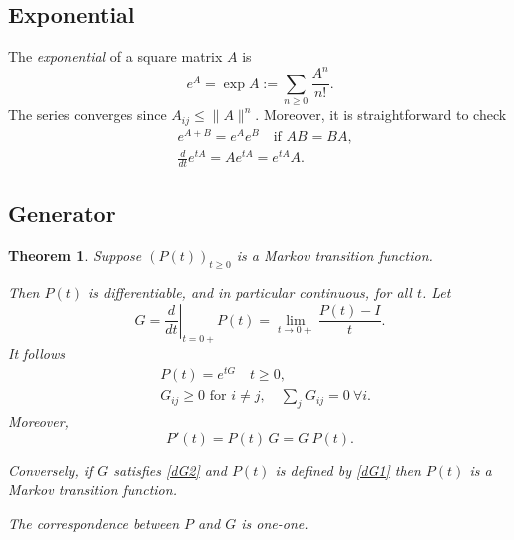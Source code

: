 \documentclass[a4paper]{amsart}
\theoremstyle{plain}
\newtheorem{theorem}{Theorem}[section]
\theoremstyle{definition}
\theoremstyle{remark}
\begin{document}
\subsection{Exponential}  The \emph{exponential} of a square matrix $ A $ is 
\begin{equation} \label{}
e^A = \exp{A} := \sum_{n\geq 0 }\frac{A^n}{n!}. 
\end{equation}
The series converges since $ A_{ij} \leq \|A\|^n $.  Moreover, it is straightforward to check 
\begin{align}
& e^{A+B} = e^A e^B \quad \text{if } AB = BA,\\
& \frac{d}{dt}e^{tA} = Ae^{tA} = e^{tA} A .
\end{align}


\subsection{Generator} \label{secgen}
\begin{theorem}
Suppose $ (P(t))_{t\geq 0} $ is a Markov transition function.

Then  $ P(t) $ is differentiable, and in particular continuous, for all $ t $.  Let 
\begin{equation} \label{defG}
G = \left. \frac{d}{dt}\right|_{t=0+} P(t)= \lim_{t\to 0+}\frac{P(t) - I}{t}.
\end{equation}
It follows 
\begin{align} 
&P(t) = e^{tG} \quad t\geq 0,   \label{dG1}\\
& G_{ij}\geq 0 \text{ for } i\neq j , \quad \sum_jG_{ij}= 0 \ \forall i. \label{dG2}
\end{align} 
Moreover, 
\begin{equation} \label{diffP}
P'(t) = P(t)\, G = G\, P(t). 
\end{equation}
 
 Conversely, if $ G $ satisfies \eqref{dG2} and  $ P(t) $ is defined by \eqref{dG1} then $ P(t) $ is a Markov transition  function. 
 
 The correspondence between $ P $ and $G $ is one-one.
\end{theorem}
\end{document}
